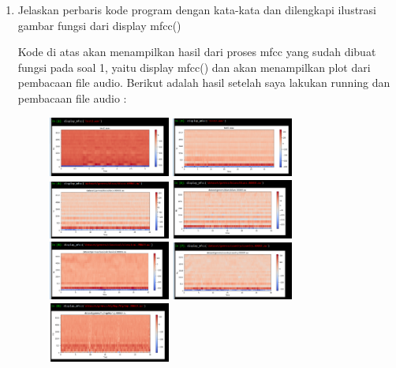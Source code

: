 \begin{enumerate}
	\item  Jelaskan perbaris kode program dengan kata-kata dan dilengkapi ilustrasi gambar fungsi dari display mfcc()
	\hfill\break
	
	Kode di atas akan menampilkan hasil dari proses mfcc yang sudah dibuat fungsi pada soal 1, yaitu display mfcc() dan akan menampilkan plot dari pembacaan file audio. Berikut adalah hasil setelah saya lakukan running dan pembacaan file audio :
	\begin{figure}[H]
	\centering
		\includegraphics[width=4cm]{figures/1174096/tugas6/hasil2_1.PNG}
		\includegraphics[width=4cm]{figures/1174096/tugas6/hasil2_2.PNG}
		\includegraphics[width=4cm]{figures/1174096/tugas6/hasil2_3.PNG}
		\includegraphics[width=4cm]{figures/1174096/tugas6/hasil2_4.PNG}
		\includegraphics[width=4cm]{figures/1174096/tugas6/hasil2_5.PNG}
		\includegraphics[width=4cm]{figures/1174096/tugas6/hasil2_6.PNG}
		\includegraphics[width=4cm]{figures/1174096/tugas6/hasil2_7.PNG}

\end{figure}
\end{enumerate}
